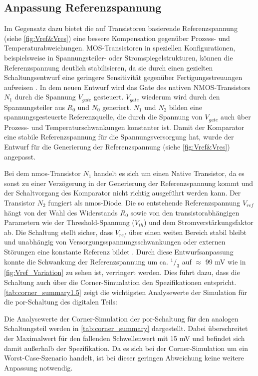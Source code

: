 \subsection{Anpassung Referenzspannung}
Im Gegensatz dazu bietet die auf Transistoren basierende Referenzspannung (siehe \autoref{fig:Vref&Vres}) eine bessere Kompensation gegenüber Prozess- und Temperaturabweichungen. MOS-Tran\-sistoren in speziellen Konfigurationen, beispielsweise in Spannungsteiler- oder Stromspiegelstrukturen, können die Referenzspannung deutlich stabilisieren, da sie durch einen gezielten Schaltungsentwurf eine geringere Sensitivität gegenüber Fertigungsstreuungen aufweisen \cite{DesignOfAnalogCMOSIntegratedCircuits}.
In dem neuen Entwurf wird das Gate des nativen NMOS-Transistors $N_1$ durch die Spannung $V_{gate}$ gesteuert. $V_{gate}$ wiederum wird durch den Spannungsteiler aus $R_0$ und $N_0$ generiert. $N_1$ und $N_2$ bilden eine spannungsgesteuerte Referenzquelle, die durch die Spannung von $V_{gate}$ auch über Prozess- und Temperaturschwankungen konstanter ist. Damit der Komparator eine stabile Referenzspannung für die Spannungsversorgung hat, wurde der Entwurf für die Generierung der Referenzspannung (siehe \autoref{fig:Vref&Vres}) angepasst.  

Bei dem \gls{nmos}-Transistor $N_1$ handelt es sich um einen Native Transistor, da es sonst zu einer Verzögerung in der Generierung der Referenzspannung kommt und der Schaltvorgang des Komparator nicht richtig ausgeführt werden kann. Der Transistor $N_2$ fungiert als \gls{nmos}-Diode. Die so entstehende Referenzspannung $V_{ref}$ hängt von der Wahl des Widerstands $R_0$ sowie von den transistorabhängigen Parametern wie der Threshold-Spannung ($V_{th}$) und dem Stromverstärkungsfaktor ab. Die Schaltung stellt sicher, dass $V_{ref}$ über einen weiten Bereich stabil bleibt und unabhängig von Versorgungsspannungsschwankungen oder externen Störungen eine konstante Referenz bildet \cite{CircuitDesigLayoutAndSimulation}. Durch diese Entwurfsanpassung konnte die Schwankung der Referenzspannung um ca. $^1/_3$ auf $\approx$ 99 mV wie in \autoref{fig:Vref_Variation} zu sehen ist, verringert werden. Dies führt dazu, dass die Schaltung auch über die Corner-Simualation den Spezifikationen entspricht. \autoref{tab:corner_summary1.5} zeigt die wichtigsten Analysewerte der Simulation für die \gls{por}-Schaltung des digitalen Teils: 

Die Analysewerte der Corner-Simulation der \gls{por}-Schaltung für den analogen Schaltungsteil werden in \autoref{tab:corner_summary} dargestellt. Dabei überschreitet der Maximalwert für den fallenden Schwellenwert mit 15 mV und befindet sich damit außerhalb der Spezifikation. Da es sich bei der Corner-Simulation um ein Worst-Case-Szenario handelt, ist bei dieser geringen Abweichung keine weitere Anpassung notwendig.


